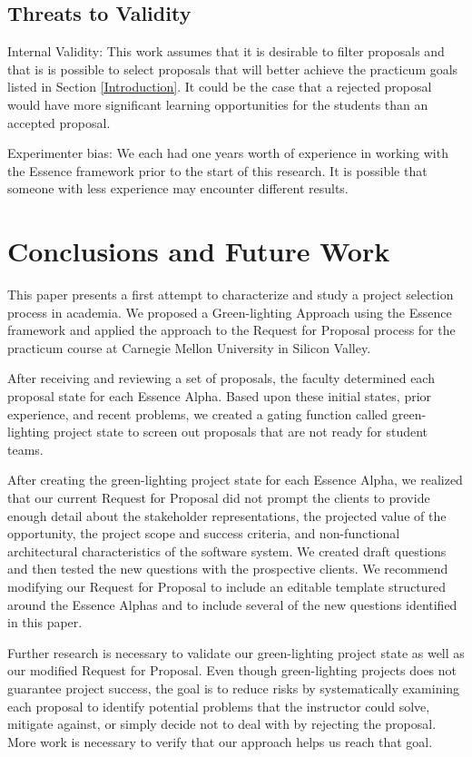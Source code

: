 \subsection{Threats to Validity}
Internal Validity: This work assumes that it is desirable to filter
proposals and that is is possible to select proposals that will better achieve the
practicum goals listed in Section \ref{Introduction}. It could be the case
that a rejected proposal would have more significant learning
opportunities for the students than an accepted proposal.

Experimenter bias: We each had one years worth of experience in working with
the Essence framework prior to the start of this research. It is
possible that someone with less experience may encounter different results.

\section{Conclusions and Future Work}
\label{Conclusion}

This paper presents a first attempt to characterize and study a project 
selection process in academia. We proposed a Green-lighting Approach using the Essence framework and
applied the approach to the Request for Proposal process for the
practicum course at Carnegie Mellon University in Silicon Valley. 

After receiving and reviewing a set of proposals, the faculty determined each 
proposal state for each Essence Alpha. Based upon these initial states, prior experience, 
and recent problems, we created a gating function called green-lighting project
state to screen out proposals that are not ready for student teams.

After creating the green-lighting project state for each
Essence Alpha, we realized that our current Request for Proposal did
not prompt the clients to provide enough detail about the stakeholder
representations, the projected value of the opportunity, the project
scope and success criteria, and non-functional architectural
characteristics of the software system. We created draft 
questions and then tested the new questions with the prospective
clients. We recommend modifying our Request for Proposal to include
an editable template structured around the Essence Alphas and to include
several of the new questions identified in this paper. 

Further research is necessary to validate our green-lighting project state 
as well as our modified Request for Proposal. 
Even though green-lighting projects does not guarantee project success, 
the goal is to reduce risks by systematically examining each proposal to identify
potential problems that the instructor could solve, mitigate against, 
or simply decide not to deal with by rejecting the proposal.
More work is necessary to verify that our approach helps us reach that goal.

